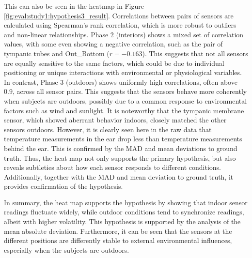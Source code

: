 This can also be seen in the heatmap in Figure \ref{fig:eval:study1:hypothesis3_result}.  
Correlations between pairs of sensors are calculated using Spearman's rank correlation, which is more robust to outliers and non-linear relationships.  
Phase 2 (interiors) shows a mixed set of correlation values, with some even showing a negative correlation, such as the pair of tympanic tubes and Out\_Bottom (\(r = -0.163\)).  
This suggests that not all sensors are equally sensitive to the same factors, which could be due to individual positioning or unique interactions with environmental or physiological variables.  
In contrast, Phase 3 (outdoors) shows uniformly high correlations, often above \(0.9\), across all sensor pairs.  
This suggests that the sensors behave more coherently when subjects are outdoors, possibly due to a common response to environmental factors such as wind and sunlight.  
It is noteworthy that the tympanic membrane sensor, which showed aberrant behavior indoors, closely matched the other sensors outdoors.
However, it is clearly seen here in the raw data that temperature measurements in the ear drop less than temperature measurements behind the ear. 
This is confirmed by the MAD and mean deviations to ground truth. 
Thus, the heat map not only supports the primary hypothesis, but also reveals subtleties about how each sensor responds to different conditions.
Additionally, together with the MAD and mean deviation to ground truth, it provides confirmation of the hypothesis.

In summary, the heat map supports the hypothesis by showing that indoor sensor readings fluctuate widely, while outdoor conditions tend to synchronize readings, albeit with higher volatility.
This hypothesis is supported by the analysis of the mean absolute deviation. 
Furthermore, it can be seen that the sensors at the different positions are differently stable to external environmental influences, especially when the subjects are outdoors.

